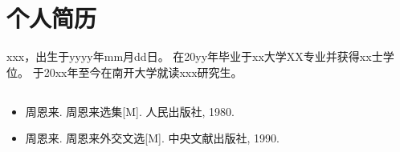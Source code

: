 
\chapter*{个人简历}


xxx，出生于yyyy年mm月dd日。
在20yy年毕业于xx大学XX专业并获得xx士学位。
于20xx年至今在南开大学就读xxx研究生。


\section*{}

\begin{itemize}
	\item 周恩来. 周恩来选集[M]. 人民出版社, 1980.
	\item 周恩来. 周恩来外交文选[M]. 中央文献出版社, 1990.
\end{itemize}




